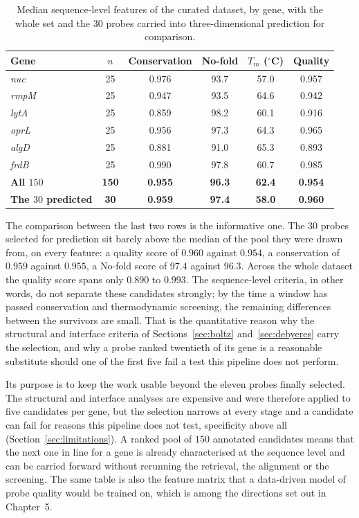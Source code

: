 \begin{table}[H]
\begin{center}
\begin{tabular}{l c c c c c}
\hline
\textbf{Gene} & \textbf{$n$} & \textbf{Conservation} & \textbf{No-fold} & \textbf{$T_m$ ($^{\circ}$C)}
 & \textbf{Quality} \\
\hline
\emph{nuc}  & 25 & 0.976 & 93.7 & 57.0 & 0.957 \\
\emph{rmpM} & 25 & 0.947 & 93.5 & 64.6 & 0.942 \\
\emph{lytA} & 25 & 0.859 & 98.2 & 60.1 & 0.916 \\
\emph{oprL} & 25 & 0.956 & 97.3 & 64.3 & 0.965 \\
\emph{algD} & 25 & 0.881 & 91.0 & 65.3 & 0.893 \\
\emph{frdB} & 25 & 0.990 & 97.8 & 60.7 & 0.985 \\
\hline
\textbf{All $150$}         & \textbf{150} & \textbf{0.955} & \textbf{96.3} & \textbf{62.4} & \textbf{0.954} \\
\textbf{The $30$ predicted} & \textbf{30}  & \textbf{0.959} & \textbf{97.4} & \textbf{58.0} & \textbf{0.960} \\
\hline
\end{tabular}
\end{center}
\caption[Curated dataset]{Median sequence-level features of the curated dataset, by gene, with the
whole set and the $30$ probes carried into three-dimensional prediction for comparison.}
\label{tab:curated}
\end{table}

The comparison between the last two rows is the informative one. The $30$ probes selected for
prediction sit barely above the median of the pool they were drawn from, on every feature: a quality
score of $0.960$ against $0.954$, a conservation of $0.959$ against $0.955$, a No-fold score of
$97.4$ against $96.3$. Across the whole dataset the quality score spans only $0.890$ to $0.993$.
The sequence-level criteria, in other words, do not separate these candidates strongly; by the time
a window has passed conservation and thermodynamic screening, the remaining differences between the
survivors are small. That is the quantitative reason why the structural and interface criteria of
Sections~\ref{sec:boltz} and~\ref{sec:debyeres} carry the selection, and why a probe ranked
twentieth of its gene is a reasonable substitute should one of the first five fail a test this
pipeline does not perform.

Its purpose is to keep the work usable beyond the eleven probes finally selected. The structural
and interface analyses are expensive and were therefore applied to five candidates per gene, but
the selection narrows at every stage and a candidate can fail for reasons this pipeline does not
test, specificity above all (Section~\ref{sec:limitations}). A ranked pool of $150$ annotated
candidates means that the next one in line for a gene is already characterised at the sequence
level and can be carried forward without rerunning the retrieval, the alignment or the screening.
The same table is also the feature matrix that a data-driven model of probe quality would be
trained on, which is among the directions set out in Chapter~5.
